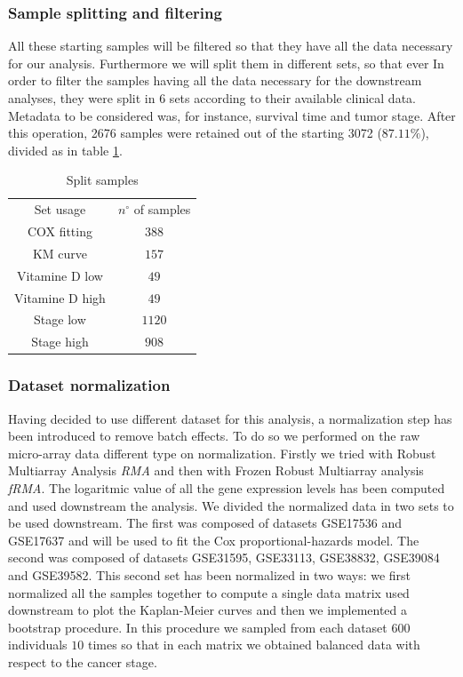 \documentclass[fleqn,10pt]{SelfArx} %
\begin{document}
		\subsubsection{Sample splitting and filtering}
		All these starting samples will be filtered so that they have all the data necessary for our analysis.
		Furthermore we will split them in different sets, so that ever
		In order to filter the samples having all the data necessary for the downstream analyses, they were split in 6 sets according to their available clinical data. Metadata to be considered was, for instance, survival time and tumor stage. After this operation, 2676 samples were retained out of the starting 3072 ($87.11\%$), divided as in table \ref{tab:samples_split}.

		\begin{table}[H]
			\centering
			\begin{tabular}{cc}
				\hline
				Set usage & $n^\circ$ of samples\\
				COX fitting & $388$\\
				KM curve & $157$\\
				Vitamine D low & $49$\\
				Vitamine D high & $49$\\
				Stage low & $1120$\\
				Stage high & $908$\\
				\hline
			\end{tabular}
			\caption{Split samples}
			\label{tab:samples_split}
		\end{table}

		\subsubsection{Dataset normalization}
		Having decided to use different dataset for this analysis, a normalization step has been introduced to remove batch effects.
		To do so we performed on the raw micro-array data different type on normalization.
		Firstly we tried with Robust Multiarray Analysis \emph{RMA} and then with Frozen Robust Multiarray analysis \emph{fRMA}.
		The logaritmic value of all the gene expression levels has been computed and used downstream the analysis.
		We divided the normalized data in two sets to be used downstream.
		The first was composed of datasets  GSE17536 and GSE17637 and will be used to fit the Cox proportional-hazards model.
		The second was composed of datasets GSE31595, GSE33113, GSE38832, GSE39084 and GSE39582.
		This second set has been normalized in two ways: we first normalized all the samples together to compute a single data matrix used downstream to plot the Kaplan-Meier curves and then we implemented a bootstrap procedure.
		In this procedure we sampled from each dataset $600$ individuals $10$ times so that in each matrix we obtained balanced data with respect to the cancer stage.
\end{document}
